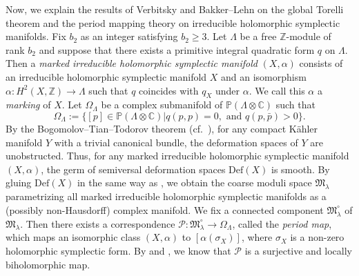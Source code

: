 \documentclass[12pt,twoside]{amsart}
\theoremstyle{definition}
\begin{document}
Now, we explain the results of Verbitsky and Bakker--Lehn on the global Torelli theorem and the period mapping theory on irreducible holomorphic symplectic manifolds.
Fix $b_2$ as an integer satisfying $b_2\ge3$.
Let $\Lambda$ be a free $\mathbb{Z}$-module of rank $b_2$ and suppose that there exists a primitive integral quadratic form $q$ on $\Lambda$. 
Then a {\it marked irreducible holomorphic symplectic manifold} $(X,\alpha)$ consists of an irreducible holomorphic symplectic manifold $X$ and an isomorphism $\alpha\colon H^2(X,\mathbb{Z})\to \Lambda$ such that $q$ coincides with $q_X$ under $\alpha$.
We call this $\alpha$ a {\it marking} of $X$.
Let $\Omega_{\Lambda}$ be a complex submanifold of $\mathbb{P}(\Lambda\otimes\mathbb{C})$ such that
\[
\Omega_{\Lambda}:=\{[p]\in\mathbb{P}(\Lambda\otimes\mathbb{C})|q(p,p)=0, \textrm{ and }q(p,\bar{p})>0\}.
\]
By the Bogomolov--Tian--Todorov theorem (cf.~\cite[Theorem 22.5]{GHJ}), for any compact K\"{a}hler manifold $Y$ with a trivial canonical bundle, the deformation spaces of $Y$ are unobstructed. 
Thus, for any marked irreducible holomorphic symplectic manifold $(X,\alpha)$, the germ of semiversal deformation spaces $\mathrm{Def}(X)$ is smooth.
By gluing $\mathrm{Def}(X)$ in the same way as \cite[\S25.2]{GHJ}, we obtain the coarse moduli space $\mathfrak{M}_{\lambda}$ parametrizing all marked irreducible holomorphic symplectic manifolds as a (possibly non-Hausdorff) complex manifold.
We fix a connected component $\mathfrak{M}_{\lambda}^\circ$ of $\mathfrak{M}_{\lambda}$.  
Then there exists a correspondence $\mathcal{P}\colon \mathfrak{M}_{\lambda}^\circ\to \Omega_{\Lambda}$, called the {\it period map}, which maps an isomorphic class $(X,\alpha)$ to $[\alpha(\sigma_X)]$, where $\sigma_X$ is a non-zero holomorphic symplectic form.
By \cite[Th\'{e}or\`{e}me 5]{beauville} and \cite[Theorem 8.1]{huybrechts}, we know that $\mathcal{P}$ is a surjective and locally biholomorphic map. 
\end{document}
